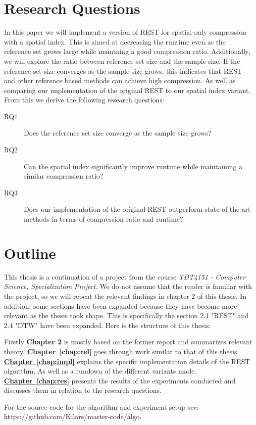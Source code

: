 \section{Research Questions}
In this paper we will implement a version of REST for spatial-only compression with a spatial index. This is aimed at decreasing the runtime even as the reference set grows large while maintaing a good compression ratio. Additionally, we will explore the ratio between reference set size and the sample size. If the reference set size converges as the sample size grows, this indicates that REST and other reference based methods can achieve high compression. As well as comparing our implementation of the original REST to our spatial index variant. From this we derive the following research questions:

\begin{description}
    \item[RQ1] Does the reference set size converge as the sample size grows?
    \item[RQ2] Can the spatial index significantly improve runtime while maintaining a similar compression ratio?
    \item[RQ3] Does our implementation of the original REST outperform state of the art methods in terms of compression ratio and runtime?
\end{description}

\section{Outline}
This thesis is a continuation of a project from the course \textit{TDT4151 - Computer Science, Specialization Project}. We do not assume that the reader is familiar with the project, so we will repeat the relevant findings in chapter 2 of this thesis. In addition, some sections have been expanded because they have become more relevant as the thesis took shape. This is specifically the section 2.1 "REST" and 2.4 "DTW" have been expanded. Here is the structure of this thesis:

Firstly \textbf{Chapter 2} is mostly based on the former report and summarizes relevant theory.
\newline
\textbf{\hyperref[chap:impl]{Chapter~\ref*{chap:rel}}} goes through work similar to that of this thesis.
\newline
\textbf{\hyperref[chap:impl]{Chapter~\ref*{chap:impl}}} explains the specific implementation details of the REST algorithm. As well as a rundown of the different variants made.
\newline
\textbf{\hyperref[chap:impl]{Chapter~\ref*{chap:res}}} presents the results of the experiments conducted and discusses them in relation to the research questions.

For the source code for the algorithm and experiment setup see:\\ https://github.com/Kilars/master-code/algo.

